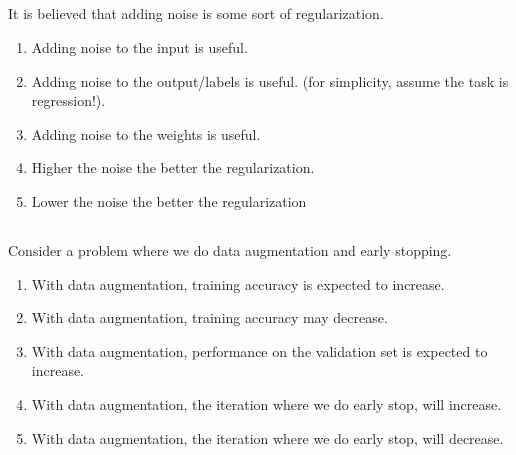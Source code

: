 \begin{frame}
\section{}
It is believed that adding noise is some sort of regularization.
\begin{enumerate}[label=(\Alph*)]
\item Adding noise to the input  is useful.   %
\item Adding noise to the output/labels is useful. (for simplicity, assume the task is regression!).
\item Adding noise to the weights is useful.    %
\item Higher the noise the better the regularization.   %
\item Lower the noise the better the regularization
\end{enumerate}
\end{frame}



\begin{frame}
\section{}
Consider a problem where we do data augmentation and early stopping.
\begin{enumerate}[label=(\Alph*)]
\item With data augmentation, training accuracy is expected to increase.
\item With data augmentation, training accuracy may decrease.   %
\item With data augmentation, performance on the validation set is expected to increase.    %
\item With data augmentation, the iteration where we do  early stop, will increase.
\item With data augmentation, the iteration where we do  early stop, will decrease.   %
\end{enumerate}
\end{frame}
